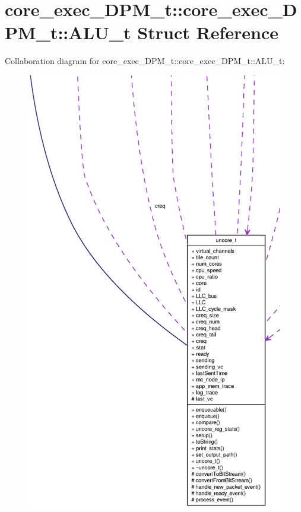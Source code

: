 \section{core\_\-exec\_\-DPM\_\-t::core\_\-exec\_\-DPM\_\-t::ALU\_\-t Struct Reference}
\label{structcore__exec__DPM__t_1_1ALU__t}
Collaboration diagram for core\_\-exec\_\-DPM\_\-t::core\_\-exec\_\-DPM\_\-t::ALU\_\-t:\nopagebreak
\begin{figure}[H]
\begin{center}
\leavevmode
\includegraphics[width=400pt]{structcore__exec__DPM__t_1_1ALU__t__coll__graph}
\end{center}
\end{figure}
